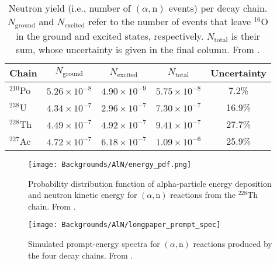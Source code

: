 \documentclass[../thesis.tex]{subfiles}
\begin{document}
\begin{table}[ht]
  \begin{tabular}{lcccc}
    \toprule
    Chain & $N_{\mathrm{ground}}$ & $N_{\mathrm{excited}}$ & $N_{\mathrm{total}}$ & Uncertainty  \\
    \midrule
    $^{210}$Po & $5.26\times10^{-8}$ & $4.90\times10^{-9}$ & $5.75\times10^{-8}$ & 7.2\%  \\
    $^{238}$U  & $4.34\times10^{-7}$ & $2.96\times10^{-7}$ & $7.30\times10^{-7}$ & 16.9\% \\
    $^{228}$Th & $4.49\times10^{-7}$ & $4.92\times10^{-7}$ & $9.41\times10^{-7}$ & 27.7\% \\
    $^{227}$Ac & $4.72\times10^{-7}$ & $6.18\times10^{-7}$ & $1.09\times10^{-6}$ & 25.9\% \\
    \bottomrule
  \end{tabular}
  \caption{Neutron yield (i.e., number of $(\alpha,\mathrm{n})$ events) per decay chain. $N_{\mathrm{ground}}$ and $N_{\mathrm{excited}}$ refer to the number of events that leave $^{16}$O in the ground and excited states, respectively. $N_{\mathrm{total}}$ is their sum, whose uncertainty is given in the final column. From \cite{Zhao_2014}.}
  \label{tab:bkgAlnNeutronYield}
\end{table}

\begin{figure}[ht]
  \texttt{[image: Backgrounds/AlN/energy\_pdf.png]}
  \caption{Probability distribution function of alpha-particle energy deposition and neutron kinetic energy for $(\alpha,\mathrm{n})$ reactions from the $^{228}$Th chain. From \cite{Zhao_2014}.}
  \label{fig:aln_energy_pdf}
\end{figure}

\begin{figure}[ht]
  \texttt{[image: Backgrounds/AlN/longpaper\_prompt\_spec]}
  \caption{Simulated prompt-energy spectra for $(\alpha,\mathrm{n})$ reactions produced by the four decay chains. From \cite{An_2017}.}
  \label{fig:aln_longpaper_prompt_spec}
\end{figure}
\end{document}
